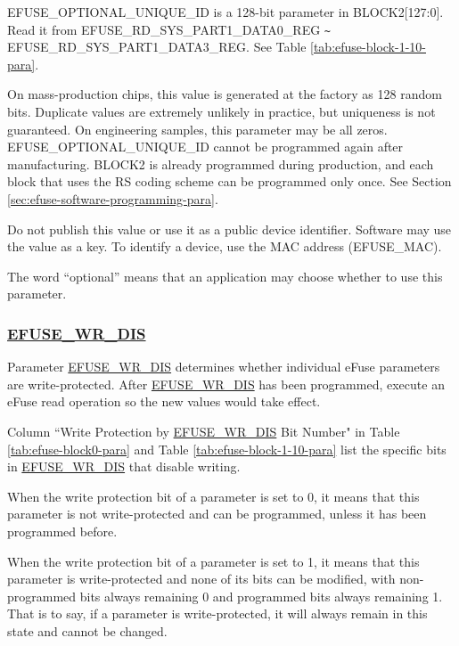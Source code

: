 \documentclass[main\_\_EN.tex]{subfiles}
\begin{document}
EFUSE\_OPTIONAL\_UNIQUE\_ID is a 128-bit parameter in BLOCK2[127:0]. Read it from EFUSE\_RD\_SYS\_PART1\_DATA0\_REG \verb+~+ EFUSE\_RD\_SYS\_PART1\_DATA3\_REG. See Table \ref{tab:efuse-block-1-10-para}.

On mass-production chips, this value is generated at the factory as 128 random bits. Duplicate values are extremely unlikely in practice, but uniqueness is not guaranteed. On engineering samples, this parameter may be all zeros. EFUSE\_OPTIONAL\_UNIQUE\_ID cannot be programmed again after manufacturing. BLOCK2 is already programmed during production, and each block that uses the RS coding scheme can be programmed only once. See Section \ref{sec:efuse-software-programming-para}.

Do not publish this value or use it as a public device identifier. Software may use the value as a key. To identify a device, use the MAC address (EFUSE\_MAC).

The word ``optional'' means that an application may choose whether to use this parameter.

\subsubsection{\hyperref[fielddesc:EFUSEWRDIS]{EFUSE\_WR\_DIS}}
\label{sec:efuse-wr-dis}

Parameter \hyperref[fielddesc:EFUSEWRDIS]{EFUSE\_WR\_DIS} determines whether individual eFuse parameters are write-protected. After \hyperref[fielddesc:EFUSEWRDIS]{EFUSE\_WR\_DIS} has been programmed, execute an eFuse read operation so the new values would take effect.

Column ``Write Protection by \hyperref[fielddesc:EFUSEWRDIS]{EFUSE\_WR\_DIS} Bit Number" in Table  \ref{tab:efuse-block0-para} and Table \ref{tab:efuse-block-1-10-para} list the specific bits in \hyperref[fielddesc:EFUSEWRDIS]{EFUSE\_WR\_DIS} that disable writing.

When the write protection bit of a parameter is set to 0, it means that this parameter is not write-protected and can be programmed, unless it has been programmed before.  

When the write protection bit of a parameter is set to 1, it means that this parameter is write-protected and none of its bits can be modified, with non-programmed bits always remaining 0 and programmed bits always remaining 1. That is to say, if a parameter is write-protected, it will always remain in this state and cannot be changed. 
\end{document}
